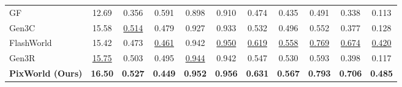 \begin{table}[t]
{\begin{tabular}{l ccc cccc ccc}
GF~\citep{wu2025geometry}           & 12.69 & 0.356 & 0.591 & 0.898 & 0.910 & 0.474 & 0.435 & 0.491 & 0.338 & 0.113 \\
Gen3C~\citep{ren2025gen3c}          & 15.58 & \underline{0.514} & 0.479 & 0.927 & 0.933 & 0.532 & 0.496 & 0.552 & 0.377 & 0.128 \\
FlashWorld~\citep{li2025flashworld} & 15.42 & 0.473 & \underline{0.461} & 0.942 & \underline{0.950} & \underline{0.619} & \underline{0.558} & \underline{0.769} & \underline{0.674} & \underline{0.420} \\
Gen3R~\citep{huang2026gen3r}        & \underline{15.75} & 0.503 & 0.495 & \underline{0.944} & 0.942 & 0.547 & 0.530 & 0.593 & 0.398 & 0.117 \\
\rowcolor{cyan!8}
\textbf{PixWorld (Ours)}           & \textbf{16.50} & \textbf{0.527} & \textbf{0.449} & \textbf{0.952} & \textbf{0.956} & \textbf{0.631} & \textbf{0.567} & \textbf{0.793} & \textbf{0.706} & \textbf{0.485} \\
\bottomrule
\end{tabular}}
\vspace{-2mm}
\end{table}